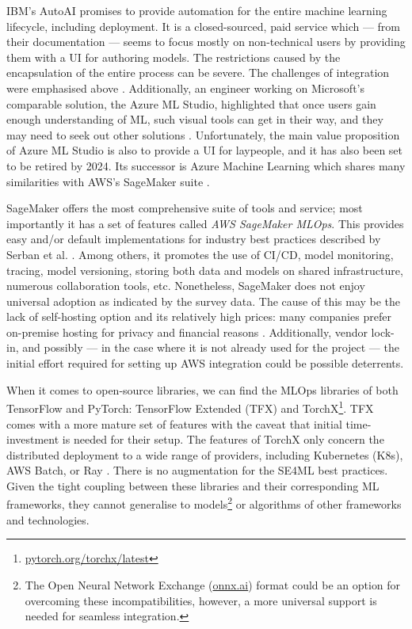 IBM's AutoAI \cite{wang2020autoai} promises to provide automation for the entire machine learning lifecycle, including deployment. It is a closed-sourced, paid service which --- from their documentation --- seems to focus mostly on non-technical users by providing them with a UI for authoring models. The restrictions caused by the encapsulation of the entire process can be severe. The challenges of integration were emphasised above \cite{sculley2015hidden}. Additionally, an engineer working on Microsoft's comparable solution, the Azure ML Studio, highlighted that once users gain enough understanding of ML, such visual tools can get in their way, and they may need to seek out other solutions \cite{amershi2019software}. Unfortunately, the main value proposition of Azure ML Studio is also to provide a UI for laypeople, and it has also been set to be retired by 2024. Its successor is Azure Machine Learning which shares many similarities with AWS's SageMaker suite \cite{joshi2020amazon}.

SageMaker offers the most comprehensive suite of tools and service; most importantly it has a set of features called \textit{AWS SageMaker MLOps}. This provides easy and/or default implementations for industry best practices described by Serban et al. \cite{serban2020adoption,serban2021practices}. Among others, it promotes the use of CI/CD, model monitoring, tracing, model versioning, storing both data and models on shared infrastructure, numerous collaboration tools, etc. Nonetheless, SageMaker does not enjoy universal adoption as indicated by the survey data. The cause of this may be the lack of self-hosting option and its relatively high prices: many companies prefer on-premise hosting for privacy and financial reasons \cite{bosch2021engineering}. Additionally, vendor lock-in, and possibly --- in the case where it is not already used for the project --- the initial effort required for setting up AWS integration could be possible deterrents.

When it comes to open-source libraries, we can find the MLOps libraries of both TensorFlow and PyTorch: TensorFlow Extended (TFX) \cite{baylor2017tfx} and TorchX\footnote{\href{https://pytorch.org/torchx/latest/}{pytorch.org/torchx/latest}}. TFX comes with a more mature set of features with the caveat that initial time-investment is needed for their setup. The features of TorchX only concern the distributed deployment to a wide range of providers, including Kubernetes (K8s), AWS Batch, or Ray \cite{moritz2018ray}. There is no augmentation for the SE4ML best practices. Given the tight coupling between these libraries and their corresponding ML frameworks, they cannot generalise to models\footnote{The Open Neural Network Exchange (\href{https://onnx.ai/}{onnx.ai}) format could be an option for overcoming these incompatibilities, however, a more universal support is needed for seamless integration.} or algorithms of other frameworks and technologies. 

